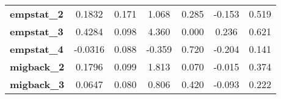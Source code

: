 \begin{center}
\begin{tabular}{lcccccc}
\textbf{empstat\_2}           &       0.1832  &        0.171     &     1.068  &         0.285        &       -0.153    &        0.519     \\
\textbf{empstat\_3}           &       0.4284  &        0.098     &     4.360  &         0.000        &        0.236    &        0.621     \\
\textbf{empstat\_4}           &      -0.0316  &        0.088     &    -0.359  &         0.720        &       -0.204    &        0.141     \\
\textbf{migback\_2}           &       0.1796  &        0.099     &     1.813  &         0.070        &       -0.015    &        0.374     \\
\textbf{migback\_3}           &       0.0647  &        0.080     &     0.806  &         0.420        &       -0.093    &        0.222     \\
\bottomrule
\end{tabular}
\end{center}
